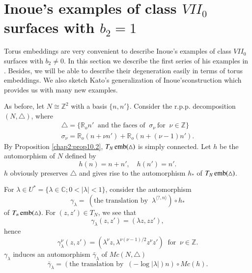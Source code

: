 \section[Inoue's examples of class $VII_{0}$ surfaces...]{Inoue's examples 
of class $VII_{0}$ surfaces with \break $b_{2} = 1$}\label{chap2:sec14} 
  
Torus embeddings are very convenient to describe Inoue's examples of
class $VII_{0}$ surfaces with $b_{2} \neq 0$. In this section we
describe the first series of his examples in \cite{keyI2}. Besides, we will
be able to describe their degeneration easily in terms of torus
embeddings. We also sketch Kato's generalization of
Inoue's\pageoriginale construction which provides us with many new
examples.   
  
As before, let $N \cong \mathbb{Z}^{2}$ with a basis $\{n, n'
\}$. Consider the r.p.p. decomposition $(N, \triangle)$, where  
\begin{gather*}
\triangle = \{\mathbb{R}_{o}n' ~\text{ and the faces of }~ \sigma_{\nu}
~\text{for }~ \nu \in \mathbb{Z}\}\\ 
\sigma_{\nu} = \mathbb{R}_{o}(n + \nu n') + \mathbb{R}_{o} (n + (\nu -
1) n').  
\end{gather*}  
 By Proposition \ref{chap2:prop10.2}, $T_{N} \operatorname{emb} (\triangle)$ is
 simply connected. Let 
$h$ be the automorphism of $N$ defined by  
$$
h (n) = n + n', \quad  h (n') = n'. 
$$
$h$ obviously preserves $\triangle$ and gives rise to the automorphism
$h_{*}$ of $T_{N}\break \emb (\triangle)$.  
  
For $\lambda \in U^{*} =\{\lambda \in \mathbb{C} ; 0 < | \lambda | <
1\}$, consider the automorphism   
$$
\gamma_{\lambda} = ~ (\text{the translation by }~ \lambda^{\langle ? ,
  n \rangle} ) \circ h_{*} 
$$
of $T_{n}\operatorname{emb} (\triangle)$. For $(z, z') \in T_{N}$, we see that 
$$
\gamma_{\lambda} (z, z') = (\lambda z , zz'),   
$$
hence 
$$
\gamma_{\lambda}^{\nu} (z , z') = (\lambda^{\nu} z , \lambda^{\nu
  (\nu-1)/2} z^{\nu} z')~ \text{ for }~  \nu \in \mathbb{Z}. 
$$ 
$\gamma_{\lambda}$ induces an automorphism $\bar{\gamma}_{\lambda}$ of
$Mc (N, \triangle)$
$$
\bar{\gamma}_{\lambda} = (\text{the translation by }~ (-\log | \lambda
|)n) \circ Mc (h) .  
$$
  
